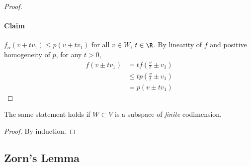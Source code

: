 \documentclass{article}
\begin{document}
\begin{proof}
    \paragraph{Claim} $f_\alpha(v + t v_1) \leq p(v + t v_1)$ for all $v \in W$, $t \in \R$.
    By linearity of $f$ and positive homogeneity of $p$, for any $t > 0$,
    \begin{align*}
        f(v \pm t v_1) &= t f\left(\frac vt \pm v_1\right) \\
                       &\leq t p\left(\frac vt \pm v_1\right) \\
                       &= p(v \pm t v_1)
    \end{align*}
\end{proof}

\begin{cor}
    The same statement holds if $W \subset V$ is a subspace of \emph{finite} codimension.
\end{cor}

\begin{proof}
    By induction.
\end{proof}

\subsection{Zorn's Lemma}
\end{document}
